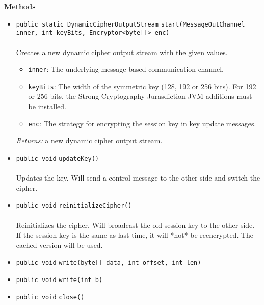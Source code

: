 \textbf{\sffamily Methods}
\begin{itemize}
\item \lstinline|public static DynamicCipherOutputStream| \lstinline|start|\lstinline|(MessageOutChannel inner, int keyBits, Encryptor<byte[]> enc)|\\ \\[-0.6em]
Creates a new dynamic cipher output stream with the given values.
\begin{itemize}
\item \lstinline|inner|: The underlying message-based communication channel.
\item \lstinline|keyBits|: The width of the symmetric key (128, 192 or 256 bits).
 For 192 or 256 bits, the Strong Cryptography Jurasdiction JVM additions
 must be installed.
\item \lstinline|enc|: The strategy for encrypting the session key in key update
 messages.
\end{itemize}

\emph{Returns:} a new dynamic cipher output stream.

\item \lstinline|public void| \lstinline|updateKey|\lstinline|()|\\ \\[-0.6em]
Updates the key. Will send a control message to the other side and
 switch the cipher.



\item \lstinline|public void| \lstinline|reinitializeCipher|\lstinline|()|\\ \\[-0.6em]
Reinitializes the cipher. Will broadcast the old session key to the other
 side. If the session key is the same as last time, it will *not* be
 reencrypted. The cached version will be used.



\item \lstinline|public void| \lstinline|write|\lstinline|(byte[] data, int offset, int len)| \\[-0.6em]




\item \lstinline|public void| \lstinline|write|\lstinline|(int b)| \\[-0.6em]




\item \lstinline|public void| \lstinline|close|\lstinline|()| \\[-0.6em]




\end{itemize}

